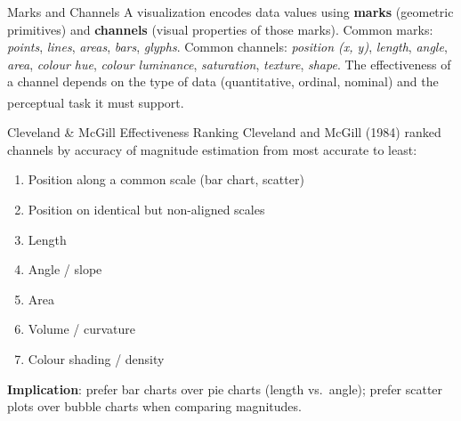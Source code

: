 \begin{v3topic}{Marks and Channels}
    A visualization encodes data values using \textbf{marks} (geometric primitives) and
    \textbf{channels} (visual properties of those marks).
    Common marks: \emph{points}, \emph{lines}, \emph{areas}, \emph{bars}, \emph{glyphs}.
    Common channels: \emph{position (x, y)}, \emph{length}, \emph{angle}, \emph{area},
    \emph{colour hue}, \emph{colour luminance}, \emph{saturation}, \emph{texture},
    \emph{shape}.
    The effectiveness of a channel depends on the type of data (quantitative, ordinal,
    nominal) and the perceptual task it must
    support\textsuperscript{\cite[][pp.~30--50]{jansenHandbuchInfografik1999}}.

\end{v3topic}
\begin{v3topic}{Cleveland \& McGill Effectiveness Ranking}
    Cleveland and McGill (1984) ranked channels by accuracy of magnitude estimation from
    most accurate to least:
    \begin{enumerate}
        \item Position along a common scale (bar chart, scatter)
        \item Position on identical but non-aligned scales
        \item Length
        \item Angle / slope
        \item Area
        \item Volume / curvature
        \item Colour shading / density
    \end{enumerate}
    \textbf{Implication}: prefer bar charts over pie charts (length vs.\ angle); prefer
    scatter plots over bubble charts when comparing magnitudes.

\end{v3topic}
